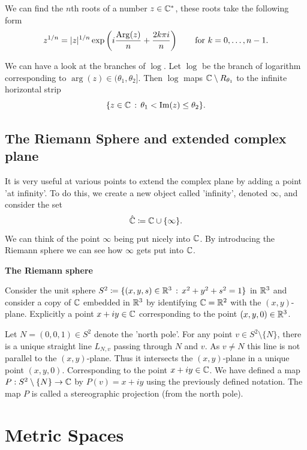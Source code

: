 \documentclass[10pt, a4paper]{article}
\begin{document}
\begin{remark}
    We can find the $n$th roots of a number $z \in \mathbb{C} ^ {*}$,
    these roots take the following form
    \[
    z ^ {1 / n} = |z| ^ {1 / n}\exp\left(i\frac{\operatorname{Arg}(z)}{n} + \frac{2k\pi i}{n}\right)\qquad\text{for } k = 0, \dotsc, n - 1.
    \]
\end{remark}

We can have a look at the branches of $\log$.
Let $\log$ be the branch of logarithm corresponding to $\arg(z) \in (\theta_1, \theta_2]$.
Then $\log$ maps $\mathbb{C}\setminus R_{\theta_1}$ to the infinite horizontal strip
\[
\{z \in \mathbb{C}\,:\, \theta_1 < \mathrm{Im}(z) \leq \theta_2\}.
\]

\subsection{The Riemann Sphere and extended complex plane}
It is very useful at various points to extend the complex plane by adding a point 'at infinity'.
To do this,
we create a new object called 'infinity',
denoted $\infty$,
and consider the set
\[
\hat{\mathbb{C}} \coloneqq \mathbb{C}\cup \{\infty\}.
\]
We can think of the point $\infty$ being put nicely into $\mathbb{C}$.
By introducing the Riemann sphere we can see how $\infty$ gets put into $\mathbb{C}$.

\textbf{The Riemann sphere}

Consider the unit sphere $S ^ 2 \coloneqq \{(x, y, s) \in \mathbb{R} ^ 3\,:\, x ^ 2 + y ^ 2 + s ^ 2 = 1\}$ in $\mathbb{R} ^ 3$ and consider a copy of $\mathbb{C}$ embedded in $\mathbb{R} ^ 3$ by identifying $\mathbb{C} = \mathbb{R} ^ 2$ with the $(x, y)$-plane.
Explicitly a point $x + iy \in \mathbb{C}$ corresponding to the point $(x, y, 0) \in \mathbb{R} ^ 3$.

Let $N = (0, 0, 1) \in S ^ 2$ denote the 'north pole'.
For any point $v \in S ^ 2 \setminus \{N\}$,
there is a unique straight line $L_{N, v}$ passing through $N$ and $v$.
As $v \neq N$ this line is not parallel to the $(x, y)$-plane.
Thus it intersects the $(x, y)$-plane in a unique point $(x, y, 0)$.
Corresponding to the point $x + iy \in \mathbb{C}$.
We have defined a map $P : S ^ 2 \setminus \{N\} \to \mathbb{C}$ by $P(v) = x + iy$ using the previously defined notation.
The map $P$ is called a stereographic projection
(from the north pole).

\newpage

\section{Metric Spaces}
\end{document}
